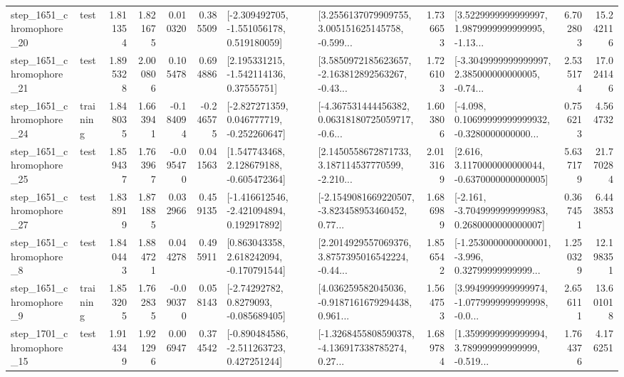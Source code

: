 \begin{tabular}{llrrrrllrlrr}
 step\_1651\_chromophore\_20 &      test &      1.811354 &    1.821675 &      0.010320 &  0.385509 &   [-2.309492705, -1.551056178, 0.519180059] &  [3.2556137079909755, 3.005151625145758, -0.599... &       1.736653 &  [3.5229999999999997, 1.9879999999999995, -1.13... &            6.702803 &         15.242116 \\
 step\_1651\_chromophore\_21 &      test &      1.895328 &    2.000806 &      0.105478 &  0.694886 &     [2.195331215, -1.542114136, 0.37555751] &  [3.5850972185623657, -2.163812892563267, -0.43... &       1.726103 &  [-3.3049999999999997, 2.385000000000005, -0.74... &            2.535174 &         17.024146 \\
 step\_1651\_chromophore\_24 &  training &      1.848035 &    1.663941 &     -0.184094 & -0.246575 &   [-2.827271359, 0.046777719, -0.252260647] &  [-4.367531444456382, 0.06318180725059717, -0.6... &       1.603806 &  [-4.098, 0.10699999999999932, -0.3280000000000... &            0.756213 &          4.564732 \\
 step\_1651\_chromophore\_25 &      test &      1.859437 &    1.763967 &     -0.095470 &  0.041563 &    [1.547743468, 2.128679188, -0.605472364] &  [2.1450558672871733, 3.187114537770599, -2.210... &       2.013169 &   [2.616, 3.1170000000000044, -0.6370000000000005] &            5.637179 &         21.770284 \\
 step\_1651\_chromophore\_27 &      test &      1.838919 &    1.871885 &      0.032966 &  0.459135 &   [-1.416612546, -2.421094894, 0.192917892] &  [-2.1549081669220507, -3.823458953460452, 0.77... &       1.686989 &  [-2.161, -3.7049999999999983, 0.2680000000000007] &            0.367451 &          6.443853 \\
  step\_1651\_chromophore\_8 &      test &      1.840443 &    1.884721 &      0.044278 &  0.495911 &    [0.863043358, 2.618242094, -0.170791544] &  [2.2014929557069376, 3.8757395016542224, -0.44... &       1.856542 &  [-1.2530000000000001, -3.996, 0.32799999999999... &            1.250329 &         12.198351 \\
  step\_1651\_chromophore\_9 &  training &      1.853205 &    1.762835 &     -0.090370 &  0.058143 &      [-2.74292782, 0.8279093, -0.085689405] &  [4.036259582045036, -0.9187161679294438, 0.961... &       1.564753 &  [3.9949999999999974, -1.0779999999999998, -0.0... &            2.656111 &         13.601018 \\
 step\_1701\_chromophore\_15 &      test &      1.914349 &    1.921296 &      0.006947 &  0.374542 &   [-0.890484586, -2.511263723, 0.427251244] &  [-1.3268455808590378, -4.136917338785274, 0.27... &       1.689784 &  [1.3599999999999994, 3.789999999999999, -0.519... &            1.764376 &          4.176251 \\

\end{tabular}
